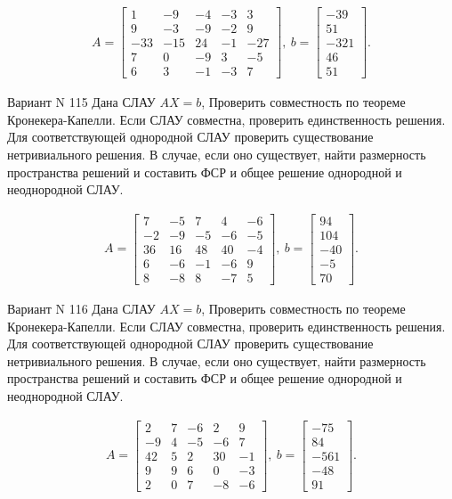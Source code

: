 \documentclass[11pt]{report}
\begin{document}
\begin{align*}
 A = \left[\begin{matrix}1 & -9 & -4 & -3 & 3\\9 & -3 & -9 & -2 & 9\\-33 & -15 & 24 & -1 & -27\\7 & 0 & -9 & 3 & -5\\6 & 3 & -1 & -3 & 7\end{matrix}\right],
\ b = \left[\begin{matrix}-39\\51\\-321\\46\\51\end{matrix}\right]. 
 \end{align*}

Вариант N 115
Дана СЛАУ $AX = b$,
Проверить совместность по теореме Кронекера-Капелли. Если СЛАУ совместна, проверить единственность решения.
Для соответствующей однородной СЛАУ проверить существование нетривиального решения. В случае, если оно существует,
найти размерность пространства решений и составить ФСР и общее решение однородной  и неоднородной СЛАУ.


\begin{align*}
 A = \left[\begin{matrix}7 & -5 & 7 & 4 & -6\\-2 & -9 & -5 & -6 & -5\\36 & 16 & 48 & 40 & -4\\6 & -6 & -1 & -6 & 9\\8 & -8 & 8 & -7 & 5\end{matrix}\right],
\ b = \left[\begin{matrix}94\\104\\-40\\-5\\70\end{matrix}\right]. 
 \end{align*}

Вариант N 116
Дана СЛАУ $AX = b$,
Проверить совместность по теореме Кронекера-Капелли. Если СЛАУ совместна, проверить единственность решения.
Для соответствующей однородной СЛАУ проверить существование нетривиального решения. В случае, если оно существует,
найти размерность пространства решений и составить ФСР и общее решение однородной  и неоднородной СЛАУ.


\begin{align*}
 A = \left[\begin{matrix}2 & 7 & -6 & 2 & 9\\-9 & 4 & -5 & -6 & 7\\42 & 5 & 2 & 30 & -1\\9 & 9 & 6 & 0 & -3\\2 & 0 & 7 & -8 & -6\end{matrix}\right],
\ b = \left[\begin{matrix}-75\\84\\-561\\-48\\91\end{matrix}\right]. 
 \end{align*}
\end{document}
